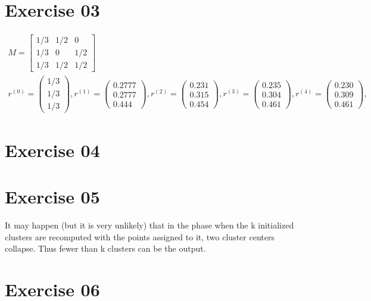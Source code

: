 \documentclass[11pt,a4paper]{scrartcl}
\begin{document}
\section*{Exercise 03}
\begin{align*}
M =
 \begin{bmatrix}
1/3 & 1/2 & 0 \\
1/3 & 0 & 1/2  \\
1/3 & 1/2 & 1/2
\end{bmatrix} \\
r^{(0)} = \left( \begin{array}{c}1/3\\1/3\\1/3\end{array} \right), 
r^{(1)} = \left( \begin{array}{c}0.2777\\0.2777\\0.444\end{array} \right), 
r^{(2)} = \left( \begin{array}{c}0.231\\0.315\\0.454\end{array} \right), 
r^{(3)} = \left( \begin{array}{c}0.235\\0.304\\0.461\end{array} \right), 
r^{(4)} = \left( \begin{array}{c}0.230\\0.309\\0.461\end{array} \right), 
\end{align*}

 



\section*{Exercise 04}
	

\section*{Exercise 05}
It may happen (but it is very unlikely) that in the phase when the k initialized clusters are recomputed with the points assigned to it, two cluster centers collapse. Thus fewer than k clusters can be the output.

\section*{Exercise 06}
\end{document}
